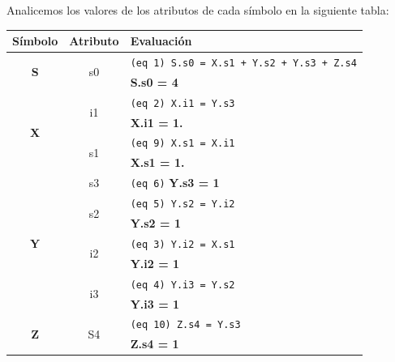 Analicemos los valores de los atributos de cada símbolo en la siguiente tabla:
\begin{center}\begin{tabular}{|| c | c | l ||}
\hline \hline

\rowcolor[rgb]{0.8, 0.8, 0.8} \textbf{Símbolo}&\textbf{Atributo}&\textbf{Evaluación}\\ \hline

\multirow{2}{*}{\textbf{S}} & \multirow{2}{*}{s0} & \texttt{(eq 1) S.s0 = X.s1 + Y.s2 + Y.s3 + Z.s4} \\ 
                           &                     & \textbf{S.s0 = 4} \\ \hline

\multirow{4}{*}{\textbf{X}} & \multirow{2}{*}{i1} & \texttt{(eq 2) X.i1 = Y.s3} \\ 
                           &                     & \textbf{X.i1 = 1.} \\ \cline{2-3}
                           & \multirow{2}{*}{s1} & \texttt{(eq 9) X.s1 = X.i1} \\ 
                           &                     & \textbf{X.s1 = 1.} \\ \hline

\multirow{7}{*}{\textbf{Y}} &                 s3  & \texttt{(eq 6)} \textbf{Y.s3 = 1} \\ \cline{2-3}
                           & \multirow{2}{*}{s2} &    \texttt{(eq 5) Y.s2 = Y.i2} \\
                           &                     & \textbf{Y.s2 = 1} \\ \cline{2-3}
                           & \multirow{2}{*}{i2} & \texttt{(eq 3) Y.i2 = X.s1} \\
                           &                     & \textbf{Y.i2 = 1} \\ \cline{2-3}
                           & \multirow{2}{*}{i3} & \texttt{(eq 4) Y.i3 = Y.s2} \\
                           &                     & \textbf{Y.i3 = 1} \\ \hline

\multirow{2}{*}{\textbf{Z}} & \multirow{2}{*}{S4} & \texttt{(eq 10) Z.s4 = Y.s3} \\
                           &                     & \textbf{Z.s4 = 1} \\ \hline


\end{tabular}
\end{center}

